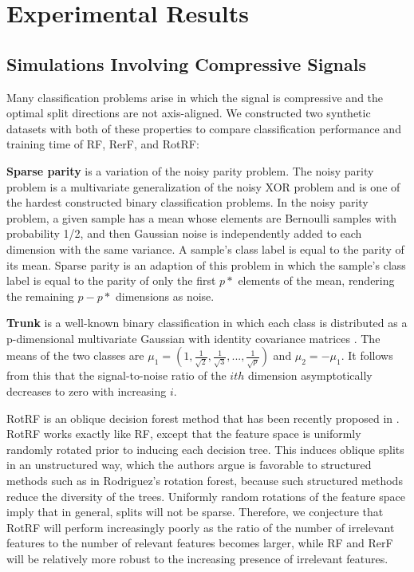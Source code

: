 \documentclass[10pt]{article}
\begin{document}
\section{Experimental Results}

\subsection{Simulations Involving Compressive Signals}
\label{section: sims}

Many classification problems arise in which the signal is compressive and the optimal split directions are not axis-aligned. We constructed two synthetic datasets with both of these properties to compare classification performance and training time of RF, RerF, and RotRF:

\textbf{Sparse parity} is a variation of the noisy parity problem. The noisy parity problem is a multivariate generalization of the noisy XOR problem and is one of the hardest constructed binary classification problems. In the noisy parity problem, a given sample has a mean whose elements are Bernoulli samples with probability 1/2, and then Gaussian noise is independently added to each dimension with the same variance.  A sample's class label is equal to the parity of its mean. Sparse parity is an adaption of this problem in which the sample's class label is equal to the parity of only the first $p*$ elements of the mean, rendering the remaining $p - p*$ dimensions as noise.

\textbf{Trunk} is a well-known binary classification in which each class is distributed as a p-dimensional multivariate Gaussian with identity covariance matrices \cite{Trunk1979}. The means of the two classes are $\mu_1 = (1,\frac{1}{\sqrt{2}},\frac{1}{\sqrt{3}},...,\frac{1}{\sqrt{p}})$ and $\mu_2 = -\mu_1$. It follows from this that the signal-to-noise ratio of the $ith$ dimension asymptotically decreases to zero with increasing $i$.

RotRF is an oblique decision forest method that has been recently proposed in \cite{Blaser2015}. RotRF works exactly like RF, except that the feature space is uniformly randomly rotated prior to inducing each decision tree. This induces oblique splits in an unstructured way, which the authors argue is favorable to structured methods such as in Rodriguez's rotation forest, because such structured methods reduce the diversity of the trees. Uniformly random rotations of the feature space imply that in general, splits will not be sparse. Therefore, we conjecture that RotRF will perform increasingly poorly as the ratio of the number of irrelevant features to the number of relevant features becomes larger, while RF and RerF will be relatively more robust to the increasing presence of irrelevant features.
\end{document}
